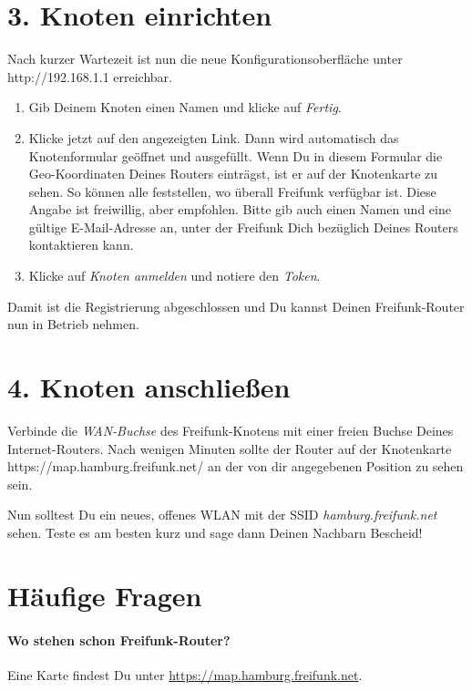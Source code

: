\documentclass[10pt,a4paper,notumble]{leaflet}
\begin{document}
\newpage

\section{3. Knoten einrichten}
Nach kurzer Wartezeit ist nun die neue Konfigurationsoberfläche unter http://192.168.1.1 erreichbar.

\begin{enumerate}
 \item Gib Deinem Knoten einen Namen und klicke auf \textit{Fertig}.
 \item Klicke jetzt auf den angezeigten Link. Dann wird automatisch das Knotenformular geöffnet und ausgefüllt. Wenn Du in diesem Formular die Geo-Koordinaten Deines Routers einträgst, ist er auf der Knotenkarte zu sehen. So können alle feststellen, wo überall Freifunk verfügbar ist. Diese Angabe ist freiwillig, aber empfohlen. Bitte gib auch einen Namen und eine gültige E-Mail-Adresse an, unter der Freifunk Dich bezüglich Deines Routers kontaktieren kann.
 \item Klicke auf \textit{Knoten anmelden} und notiere den \textit{Token}.
\end{enumerate}
Damit ist die Registrierung abgeschlossen und Du kannst Deinen Freifunk-Router nun in Betrieb nehmen.

\section{4. Knoten anschließen}
Verbinde die \textit{WAN-Buchse} des Freifunk-Knotens mit einer freien Buchse Deines Internet-Routers. Nach wenigen Minuten sollte der Router auf der Knotenkarte \mbox{https://map.hamburg.freifunk.net/} an der von dir angegebenen Position zu sehen sein.

Nun solltest Du ein neues, offenes WLAN mit der SSID \mbox{\textit{hamburg.freifunk.net}} sehen. Teste es am besten kurz und sage dann Deinen Nachbarn Bescheid!




\newpage
\section{Häufige Fragen}
\setlength{\parskip}{0.1em}
\paragraph{Wo stehen schon Freifunk-Router?} Eine Karte findest Du unter \href{https://map.hamburg.freifunk.net}{https://map.hamburg.freifunk.net}.
\end{document}
